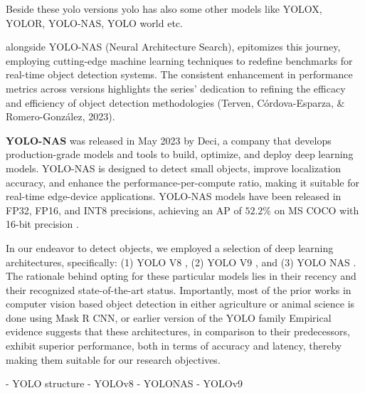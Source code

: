 Beside these yolo versions yolo has also some other models like YOLOX, YOLOR, YOLO-NAS, YOLO world etc. 







alongside YOLO-NAS (Neural Architecture Search), epitomizes this journey, employing cutting-edge machine learning techniques to redefine benchmarks for real-time object detection systems. The consistent enhancement in performance metrics across versions highlights the series' dedication to refining the efficacy and efficiency of object detection methodologies (Terven, Córdova-Esparza, $\&$ Romero-González, 2023).




\textbf{YOLO-NAS} \cite{ultralyticsYOLONASNeural} was released in May 2023 by Deci, a company that develops production-grade models and tools to
build, optimize, and deploy deep learning models. YOLO-NAS is designed to detect small objects, improve localization
accuracy, and enhance the performance-per-compute ratio, making it suitable for real-time edge-device applications. YOLO-NAS models have been released in FP32, FP16, and INT8 precisions, achieving an AP of
$52.2\%$ on MS COCO with 16-bit precision 
\cite{terven2304comprehensive}.




In our endeavor to detect objects, we employed a selection of deep learning architectures, specifically: (1) YOLO V8 \cite{ultralyticsYOLOv8}, (2) YOLO V9 \cite{wang2024yolov9}, and (3) YOLO NAS \cite{ultralyticsYOLONASNeural}. The rationale behind opting for these particular models lies in their recency and their recognized state-of-the-art status. Importantly, most of the prior works in computer vision based object detection in either agriculture or animal science is done using Mask R CNN, or earlier version of the YOLO family Empirical evidence suggests that these architectures, in comparison to their predecessors, exhibit superior performance, both in terms of accuracy and latency, thereby making them suitable for our research objectives.


- YOLO structure
- YOLOv8
- YOLONAS
- YOLOv9





